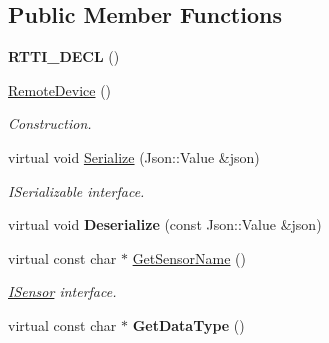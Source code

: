 \subsection*{Public Member Functions}
\begin{DoxyCompactItemize}
\item 
\mbox{\label{class_remote_device_a881cb3807daed0681e7a987e607b01f9}} 
{\bfseries R\+T\+T\+I\+\_\+\+D\+E\+CL} ()
\item 
\mbox{\label{class_remote_device_a2dfcfa2accb2a843dc4e2c727b51dca9}} 
\hyperlink{class_remote_device_a2dfcfa2accb2a843dc4e2c727b51dca9}{Remote\+Device} ()
\begin{DoxyCompactList}\small\item\em Construction. \end{DoxyCompactList}\item 
\mbox{\label{class_remote_device_a1d70e691a7542ac33c403802e3f29b58}} 
virtual void \hyperlink{class_remote_device_a1d70e691a7542ac33c403802e3f29b58}{Serialize} (Json\+::\+Value \&json)
\begin{DoxyCompactList}\small\item\em I\+Serializable interface. \end{DoxyCompactList}\item 
\mbox{\label{class_remote_device_ad133fb07547f9d6bb694330dbbfaf684}} 
virtual void {\bfseries Deserialize} (const Json\+::\+Value \&json)
\item 
\mbox{\label{class_remote_device_abfc791a402ed89d69619d5832ee216b5}} 
virtual const char $\ast$ \hyperlink{class_remote_device_abfc791a402ed89d69619d5832ee216b5}{Get\+Sensor\+Name} ()
\begin{DoxyCompactList}\small\item\em \hyperlink{class_i_sensor}{I\+Sensor} interface. \end{DoxyCompactList}\item 
\mbox{\label{class_remote_device_a51ee1143cd9812af9dcc21d5a1948f57}} 
virtual const char $\ast$ {\bfseries Get\+Data\+Type} ()
\item 
\mbox{\label{class_remote_device_a93c2e32258e85fc97e8791e746c7c51c}} 

\end{DoxyCompactItemize}
